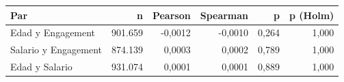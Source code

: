 \begin{tabular}{lrrrrr}
\toprule
Par & n & Pearson & Spearman & p & p (Holm) \\
\midrule
Edad y Engagement & 901.659 & -0,0012 & -0,0010 & 0,264 & 1,000 \\
Salario y Engagement & 874.139 & 0,0003 & 0,0002 & 0,789 & 1,000 \\
Edad y Salario & 931.074 & 0,0001 & 0,0001 & 0,889 & 1,000 \\
\bottomrule
\end{tabular}
